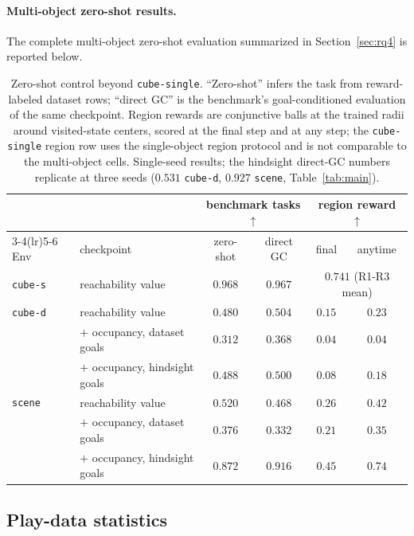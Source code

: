 \documentclass{article}
\begin{document}
\paragraph{Multi-object zero-shot results.}
The complete multi-object zero-shot evaluation summarized in Section~\ref{sec:rq4} is reported below.

\begin{table}[t]
\centering\small
\begin{tabular}{l l cc cc}
\toprule
& & \multicolumn{2}{c}{benchmark tasks $\uparrow$} & \multicolumn{2}{c}{region reward $\uparrow$} \\
\cmidrule(lr){3-4}\cmidrule(lr){5-6}
Env & checkpoint & zero-shot & direct GC & final & anytime \\
\midrule
\texttt{cube-s} & reachability value & $0.968$ & $0.967$ & \multicolumn{2}{c}{$0.741$ (R1-R3 mean)} \\
\midrule
\texttt{cube-d} & reachability value & $0.480$ & $0.504$ & $0.15$ & $0.23$ \\
& $+$ occupancy, dataset goals     & $0.312$ & $0.368$ & $0.04$ & $0.04$ \\
& $+$ occupancy, hindsight goals & $0.488$ & $0.500$ & $0.08$ & $0.18$ \\
\midrule
\texttt{scene} & reachability value & $0.520$ & $0.468$ & $0.26$ & $0.42$ \\
& $+$ occupancy, dataset goals     & $0.376$ & $0.332$ & $0.21$ & $0.35$ \\
& $+$ occupancy, hindsight goals & $\mathbf{0.872}$ & $0.916$ & $\mathbf{0.45}$ & $\mathbf{0.74}$ \\
\bottomrule
\end{tabular}
\caption{Zero-shot control beyond \texttt{cube-single}.
``Zero-shot'' infers the task from reward-labeled dataset rows; ``direct GC'' is the benchmark's goal-conditioned evaluation of the same checkpoint.
Region rewards are conjunctive balls at the trained radii around visited-state centers, scored at the final step and at any step; the \texttt{cube-single} region row uses the single-object region protocol and is not comparable to the multi-object cells.
Single-seed results; the hindsight direct-GC numbers replicate at three seeds ($0.531$ \texttt{cube-d}, $0.927$ \texttt{scene}, Table~\ref{tab:main}).}
\label{tab:multienv-zeroshot}
\end{table}


\subsection{Play-data statistics}
\label{app:playstats}
\end{document}
